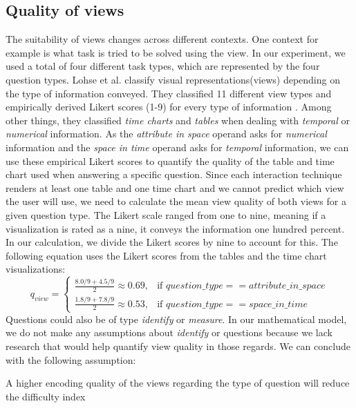 \subsection{Quality of views}
The suitability of views changes across different contexts. One context for example is what task is tried to be solved
using the view. In our experiment, we used a total of four different task types, which are represented by the four question
types. Lohse et al. classify visual representations(views)
depending on the type of information conveyed. They classified 11 different view types and empirically derived Likert
scores (1-9) for every type of information \citep*{Lohse.1994}. Among other things, they classified \textit{time charts} and 
\textit{tables} when dealing with \textit{temporal} or \textit{numerical} information. As the \textit{attribute in space} operand
asks for \textit{numerical} information and the \textit{space in time} operand asks for \textit{temporal} information, we can 
use these empirical Likert scores to quantify the quality of the table and time chart used when answering a specific question.
Since each interaction technique renders at least one table and one time chart and we cannot predict which view the user will use, we
need to calculate the mean view quality of both views for a given question type. The Likert scale ranged from one to nine, meaning if a
visualization is rated as a nine, it conveys the information one hundred percent. In our calculation, we divide the Likert scores by nine to account
for this. The following equation uses the Likert scores from the tables and the time chart visualizations:
\begin{equation} \label{qualityViewEquation}
    q_{view}= 
    \begin{cases}
        \frac{8.0 / 9 + 4.5 / 9}{2} \approx 0.69,& \text{if } question\_type == attribute\_in\_space \\
        \frac{1.8 / 9 + 7.8 / 9}{2} \approx 0.53,& \text{if } question\_type == space\_in\_time 
    \end{cases}
\end{equation}
Questions could also be of type \textit{identify} or \textit{measure}.
In our mathematical model, we do not make any assumptions about \textit{identify} or  questions because we lack research that
would help quantify view quality in those regards. We can conclude with the following assumption:
\begin{statements}[resume]
    \item A higher encoding quality of the views regarding the type of question will reduce the difficulty index
\end{statements}
